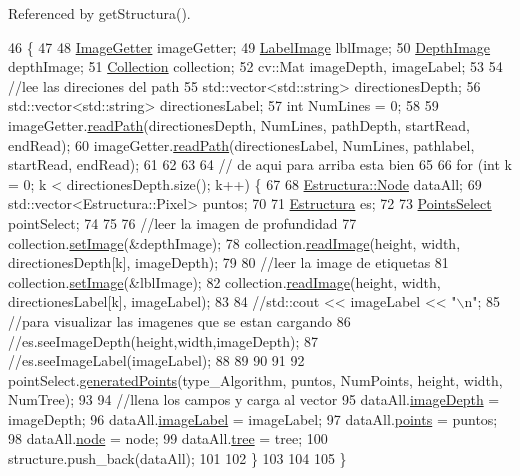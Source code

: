 Referenced by get\+Structura().


\begin{DoxyCode}
46                                                         \{
47 
48     \hyperlink{classImageGetter}{ImageGetter} imageGetter;
49     \hyperlink{classLabelImage}{LabelImage} lblImage;
50     \hyperlink{classDepthImage}{DepthImage} depthImage;
51     \hyperlink{classCollection}{Collection} collection;
52     cv::Mat imageDepth, imageLabel;
53 
54     \textcolor{comment}{//lee las direciones del path}
55     std::vector<std::string> directionesDepth;
56     std::vector<std::string> directionesLabel;
57     \textcolor{keywordtype}{int} NumLines = 0;
58 
59     imageGetter.\hyperlink{classImageGetter_a92cd05c7e86df5bf83ee9f428a805fb3}{readPath}(directionesDepth, NumLines, pathDepth, startRead, endRead);
60     imageGetter.\hyperlink{classImageGetter_a92cd05c7e86df5bf83ee9f428a805fb3}{readPath}(directionesLabel, NumLines, pathlabel, startRead, endRead);
61 
62 
63 
64     \textcolor{comment}{// de aqui para arriba esta bien}
65 
66     \textcolor{keywordflow}{for} (\textcolor{keywordtype}{int} k = 0; k < directionesDepth.size(); k++) \{
67 
68         \hyperlink{structEstructura_1_1Node}{Estructura::Node} dataAll;
69         std::vector<Estructura::Pixel> puntos;
70         
71         \hyperlink{classEstructura}{Estructura} es;
72 
73         \hyperlink{classPointsSelect}{PointsSelect} pointSelect;
74         
75         
76         \textcolor{comment}{//leer la imagen de profundidad}
77         collection.\hyperlink{classCollection_a57290652c3cf6fc744c5614e0bf49d15}{setImage}(&depthImage);
78         collection.\hyperlink{classCollection_a251f7033e22c16a7b12dde94d9a7021e}{readImage}(height, width, directionesDepth[k], imageDepth);
79 
80         \textcolor{comment}{//leer la image de etiquetas}
81         collection.\hyperlink{classCollection_a57290652c3cf6fc744c5614e0bf49d15}{setImage}(&lblImage);
82         collection.\hyperlink{classCollection_a251f7033e22c16a7b12dde94d9a7021e}{readImage}(height, width, directionesLabel[k], imageLabel);
83 
84         \textcolor{comment}{//std::cout << imageLabel << "\(\backslash\)n";}
85         \textcolor{comment}{//para visualizar las imagenes que se estan cargando}
86         \textcolor{comment}{//es.seeImageDepth(height,width,imageDepth);}
87         \textcolor{comment}{//es.seeImageLabel(imageLabel);}
88 
89 
90 
91 
92         pointSelect.\hyperlink{classPointsSelect_a1c487676ff7dc9a8cfd7dbae206a04ae}{generatedPoints}(type\_Algorithm, puntos, NumPoints, height, width, 
      NumTree);
93 
94         \textcolor{comment}{//llena los campos y carga al vector}
95         dataAll.\hyperlink{structEstructura_1_1Node_a117720b249be79aaf71bc0a42d2c9b6b}{imageDepth} = imageDepth;
96         dataAll.\hyperlink{structEstructura_1_1Node_a7905c0696cb214e84ac855e7a6b6366c}{imageLabel} = imageLabel;
97         dataAll.\hyperlink{structEstructura_1_1Node_a0ad44a6cbbffdcd39f26733cc0e6f196}{points} = puntos;
98         dataAll.\hyperlink{structEstructura_1_1Node_a2e360ae2439d4d82dd38d9b30358feac}{node} = node;
99         dataAll.\hyperlink{structEstructura_1_1Node_abb400b36a5e8179766c35bc73c22e816}{tree} = tree;
100         structure.push\_back(dataAll);
101         
102     \}
103 
104 
105 \}\end{DoxyCode}
